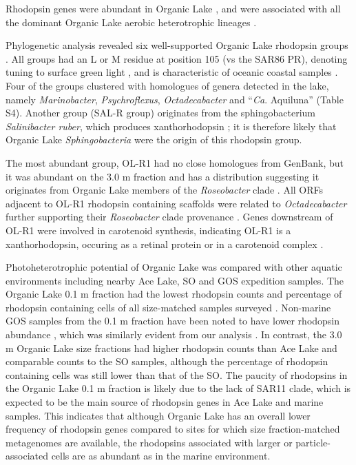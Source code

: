 Rhodopsin genes were abundant in Organic Lake , and were associated with all the dominant Organic Lake aerobic heterotrophic lineages . 

Phylogenetic analysis revealed six well-supported Organic Lake rhodopsin groups . 
All groups had an L or M residue at position 105 (vs the SAR86 \ac{PR}), denoting tuning to surface green light \cite{Man2003, Gomez-Consarnau2007}, and is characteristic of oceanic coastal samples \cite{Rusch2007}. 
Four of the groups clustered with homologues of genera detected in the lake, namely \emph{Marinobacter}, \emph{Psychroflexus}, \emph{Octadecabacter} and ``\emph{Ca}. Aquiluna''  (Table S4). 
Another group (SAL-R group) originates from the sphingobacterium \emph{Salinibacter ruber}, which produces xanthorhodopsin \cite{Balashov2005}; it is therefore likely that Organic Lake \emph{Sphingobacteria}  were the origin of this rhodopsin group. 

The most abundant group, OL-R1  had no close homologues from GenBank, but it was abundant on the 3.0 \textmu{}m fraction and has a distribution suggesting it originates from Organic Lake members of the \emph{Roseobacter} clade . 
All \acp{ORF} adjacent to OL-R1 rhodopsin containing scaffolds were related to \emph{Octadecabacter} further supporting their \emph{Roseobacter} clade provenance . 
Genes downstream of OL-R1 were involved in carotenoid synthesis, indicating OL-R1 is a xanthorhodopsin, occuring as a retinal protein or in a carotenoid complex \cite{Balashov2005}. %


Photoheterotrophic potential of Organic Lake was compared with other aquatic environments including nearby Ace Lake, \ac{SO} and \ac{GOS} expedition samples. 
The Organic Lake 0.1 \textmu{}m fraction had the lowest rhodopsin counts and percentage of rhodopsin containing cells of all size-matched samples surveyed . 
Non-marine \ac{GOS} samples from the 0.1 \textmu{}m fraction have been noted to have lower rhodopsin abundance \cite{Sharma2008}, which was similarly evident from our analysis . 
In contrast, the 3.0 \textmu{}m Organic Lake size fractions had higher rhodopsin counts than Ace Lake and comparable counts to the \ac{SO} samples, although the percentage of rhodopsin containing cells was still lower than that of the \ac{SO}. 
The paucity of rhodopsins in the Organic Lake 0.1 \textmu{}m fraction is likely due to the lack of SAR11 clade, which is expected to be the main source of rhodopsin genes in Ace Lake and marine samples. 
This indicates that although Organic Lake has an overall lower frequency of rhodopsin genes compared to sites for which size fraction-matched metagenomes are available, the rhodopsins associated with larger or particle-associated cells are as abundant as in the marine environment.

